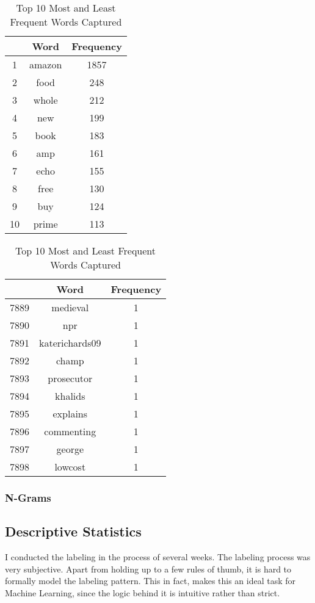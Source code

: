 			\begin{table}[H]
				\centering
				\begin{tabular}{ccc}
					\hline\hline
						&	Word 	& Frequency \\
					\hline
					1	&	amazon 	& 1857	\\
					2	&	food	& 248	\\	
					3	&	whole 	& 212	\\
					4	&	new		& 199	\\
					5	&	book	& 183	\\
					6	&	amp		& 161	\\
					7	&	echo 	& 155	\\
					8	&	free 	& 130	\\
					9	&	buy 	& 124	\\
					10	&	prime 	& 113	\\
					\hline\hline				
				\end{tabular}
				\qquad 
				\begin{tabular}{ccc}
					\hline\hline
					&	Word 	& Frequency \\
					\hline
					7889	&	medieval 		& 1	\\
					7890	&	npr				& 1	\\	
					7891	&	katerichards09 	& 1	\\
					7892	&	champ			& 1	\\
					7893	&	prosecutor		& 1	\\
					7894	&	khalids			& 1	\\
					7895	&	explains 		& 1	\\
					7896	&	commenting 		& 1	\\
					7897	&	george 			& 1	\\
					7898	&	lowcost 		& 1	\\
					\hline\hline				
				\end{tabular}
				\caption{Top 10 Most and Least Frequent Words Captured}
				\label{table:BOW_top_words}%
			\end{table}%
		
		\subsubsection{N-Grams}
	
	\subsection{Descriptive Statistics}
		I conducted the labeling in the process of several weeks. The labeling process was very subjective. Apart from holding up to a few rules of thumb, it is hard to formally model the labeling pattern. This in fact, makes this an ideal task for Machine Learning, since the logic behind it is intuitive rather than strict.
		
